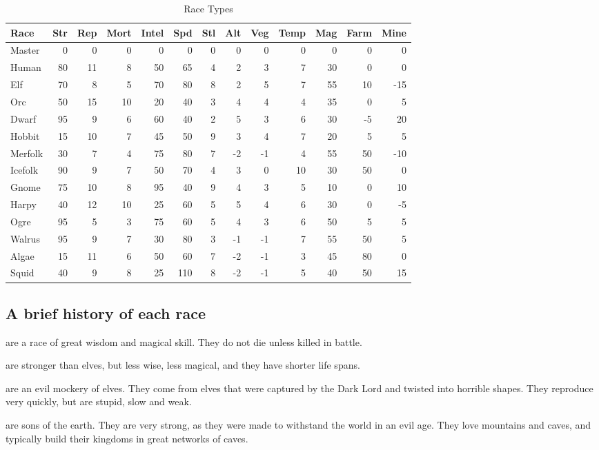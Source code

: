 \begin{same}
\begin{table}[hbpt]
\caption{Race Types}
\begin{tabular}{ || l | r | r | r | r | r | r | r | r | r | r | r | r || }
\hline
Race   &Str&Rep&Mort&Intel&Spd&Stl&Alt&Veg&Temp&Mag&Farm&Mine\\
\hline
Master  & 0& 0& 0& 0&  0&0&0& 0& 0& 0& 0& 0\\
Human   &80&11& 8&50& 65&4&2& 3& 7&30& 0& 0\\
Elf     &70& 8& 5&70& 80&8&2& 5& 7&55&10&-15\\
Orc     &50&15&10&20& 40&3&4& 4& 4&35& 0& 5\\
Dwarf   &95& 9& 6&60& 40&2&5& 3& 6&30&-5&20\\
Hobbit  &15&10& 7&45& 50&9&3& 4& 7&20& 5& 5\\
Merfolk &30& 7& 4&75& 80&7&-2&-1& 4&55&50&-10\\
Icefolk &90& 9& 7&50& 70&4&3& 0&10&30&50& 0\\
Gnome   &75&10& 8&95& 40&9&4& 3& 5&10& 0&10\\
Harpy   &40&12&10&25& 60&5&5& 4& 6&30& 0&-5\\
Ogre    &95& 5& 3&75& 60&5&4& 3& 6&50& 5& 5\\
Walrus  &95& 9& 7&30& 80&3&-1&-1& 7&55&50& 5\\
Algae   &15&11& 6&50& 60&7&-2&-1& 3&45&80& 0\\
Squid   &40& 9& 8&25& 110&8&-2&-1& 5&40&50&15\\
\hline
\end{tabular}
\end{table}
\end{same}

\subsection{A brief history of each race}
\indent {} are a race of great wisdom and magical skill.  They do
not die unless killed in battle.

 are stronger than elves, but less wise, less magical, and
they have shorter life spans.

 are an evil mockery of elves.  They come from elves that were
captured by the Dark Lord and twisted into horrible shapes.  They
reproduce very quickly, but are stupid, slow and weak.

 are sons of the earth.  They are very strong, as they were
made to withstand the world in an evil age.  They love mountains and caves,
and typically build their kingdoms in great networks of caves.


